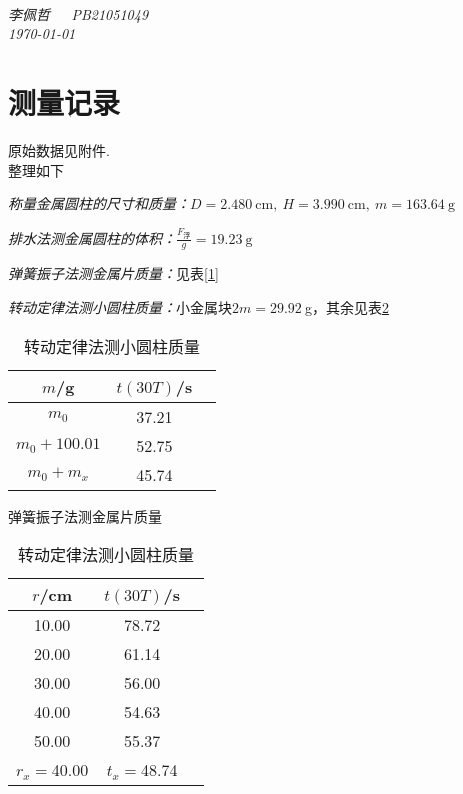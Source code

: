 \documentclass[a4paper]{article}%
\title{\heiti{实验报告}}%
\author{{\emph{李佩哲}}}
\date{\emph{\small\today}}
\begin{document}
\begin{center}
\\
\emph{李佩哲~~~PB21051049~~~\\\today}
\end{center}
\section{测量记录}
原始数据见附件.\\整理如下

\emph{称量金属圆柱的尺寸和质量：}$D=2.480~\text{cm},~H=3.990~\text{cm},~m=163.64~\text{g}$

\emph{排水法测金属圆柱的体积：}$\frac{F_\text{浮}}{g}=19.23~\text{g}$

\emph{弹簧振子法测金属片质量：}见表\ref{1}

\emph{转动定律法测小圆柱质量：}小金属块$2m=29.92~$g，其余见表\ref{2}
\begin{table}[H]
    \begin{minipage}{0.5\linewidth}
        \centering
        \begin{tabular}{ccc}
            \toprule
            $m$/g & $t(30T)$/s\\
            \midrule
            $m_0$&37.21\\
            $m_0+100.01$&52.75\\
            $m_0+m_x$&45.74\\
            \bottomrule
        \end{tabular}
        \caption{弹簧振子法测金属片质量}\label{1}
    \end{minipage}
    \begin{minipage}{0.5\linewidth}  
        \centering
        \begin{tabular}{ccc} 
            \toprule
            $r$/cm & $t(30T)$/s\\
            \midrule
            10.00&78.72\\
            20.00&61.14\\
            30.00&56.00\\
            40.00&54.63\\
            50.00&55.37\\
            \midrule
            $r_x=$40.00&$t_x=$48.74\\
            \bottomrule
        \end{tabular}
        \caption{转动定律法测小圆柱质量}\label{2}
    \end{minipage}
\end{table}
\end{document}
